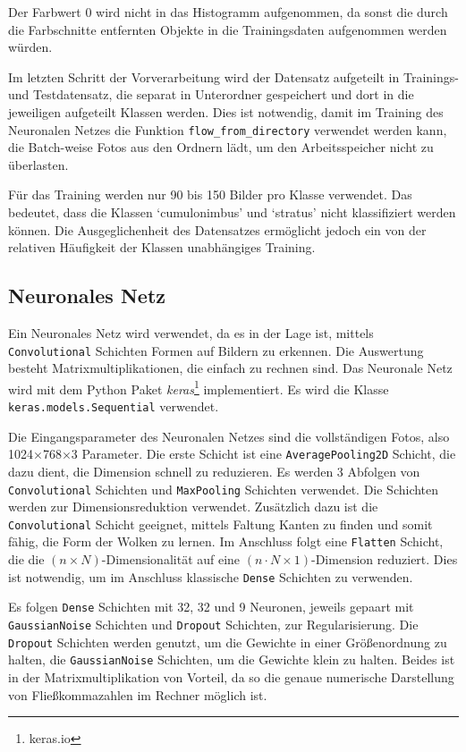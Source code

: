 Der Farbwert $0$ wird nicht in das Histogramm aufgenommen, da sonst
die durch die Farbschnitte entfernten Objekte in die Trainingsdaten
aufgenommen werden würden.

Im letzten Schritt der Vorverarbeitung wird der Datensatz aufgeteilt in
Trainings- und Testdatensatz, die separat in Unterordner gespeichert und
dort in die jeweiligen aufgeteilt Klassen werden. Dies ist notwendig,
damit im Training des Neuronalen Netzes die Funktion
\texttt{flow\_from\_directory} verwendet werden kann, die Batch-weise
Fotos aus den Ordnern lädt, um den Arbeitsspeicher nicht zu überlasten.

Für das Training werden nur 90 bis 150 Bilder pro Klasse verwendet.
Das bedeutet, dass die Klassen `cumulonimbus' und `stratus' nicht klassifiziert werden können.
Die Ausgeglichenheit des Datensatzes ermöglicht jedoch ein von der relativen Häufigkeit der
Klassen unabhängiges Training.

\hypertarget{neuronales-netz}{%
\subsection{Neuronales Netz}\label{neuronales-netz}}

Ein Neuronales Netz wird verwendet, da es in der Lage ist, mittels
\texttt{Convolutional} Schichten Formen auf Bildern zu erkennen. Die
Auswertung besteht Matrixmultiplikationen, die einfach zu rechnen sind.
Das Neuronale Netz wird mit dem Python Paket \emph{keras}\footnote{keras.io}
implementiert. Es wird die Klasse \texttt{keras.models.Sequential}
verwendet.

Die Eingangsparameter des Neuronalen Netzes sind die vollständigen
Fotos, also 1024$\times$768$\times$3 Parameter. Die erste Schicht ist eine
\texttt{AveragePooling2D} Schicht, die dazu dient, die Dimension schnell
zu reduzieren. Es werden 3 Abfolgen von \texttt{Convolutional} Schichten
und \texttt{MaxPooling} Schichten verwendet. Die Schichten werden zur
Dimensionsreduktion verwendet. Zusätzlich dazu ist die
\texttt{Convolutional} Schicht geeignet, mittels Faltung Kanten zu
finden und somit fähig, die Form der Wolken zu lernen. Im Anschluss
folgt eine \texttt{Flatten} Schicht, die die
$(n \times N)$-Dimensionalität auf eine
$(n \cdot N \times 1)$-Dimension reduziert. Dies ist notwendig, um im
Anschluss klassische \texttt{Dense} Schichten zu verwenden.

Es folgen \texttt{Dense} Schichten mit 32, 32 und 9 Neuronen, jeweils
gepaart mit \texttt{GaussianNoise} Schichten und \texttt{Dropout}
Schichten, zur Regularisierung. Die \texttt{Dropout} Schichten werden
genutzt, um die Gewichte in einer Größenordnung zu halten, die
\texttt{GaussianNoise} Schichten, um die Gewichte klein zu halten.
Beides ist in der Matrixmultiplikation von Vorteil, da so die genaue
numerische Darstellung von Fließkommazahlen im Rechner möglich ist.

